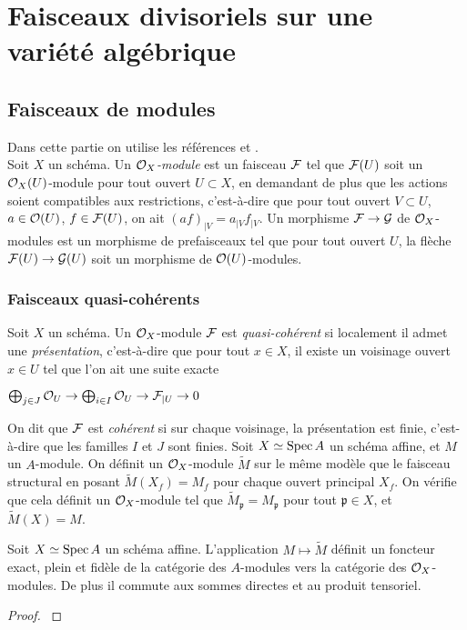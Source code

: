 \chapter{Faisceaux divisoriels sur une variété algébrique}


\section{Faisceaux de modules}

\noindent Dans cette partie on utilise les références \cite{QingLiu} et \cite{Hartshorne}.\\

Soit $X$ un schéma. Un \textit{$\mathcal{O}_X$-module} est un faisceau $\mathcal{F}$ tel que $\mathcal{F}(U)$ soit un $\mathcal{O}_X(U)$-module pour tout ouvert $U\subset X$, en demandant de plus que les actions soient compatibles aux restrictions, c'est-à-dire que pour tout ouvert $V\subset U$, $a\in\mathcal{O}(U)$, $f\in \mathcal{F}(U)$, on ait $(af)_{|V}=a_{|V}f_{|V}$. Un morphisme $\mathcal{F}\rightarrow\mathcal{G}$ de $\mathcal{O}_X$-modules est un morphisme de prefaisceaux tel que pour tout ouvert $U$, la flèche $\mathcal{F}(U)\rightarrow\mathcal{G}(U)$ soit un morphisme de $\mathcal{O}(U)$-modules. 

\subsection{Faisceaux quasi-cohérents}

Soit $X$ un schéma. Un $\mathcal{O}_X$-module $\mathcal{F}$ est \textit{quasi-cohérent} si localement il admet une \textit{présentation}, c'est-à-dire que pour tout $x\in X$, il existe un voisinage ouvert $x\in U$ tel que l'on ait une suite exacte
\begin{center}
$\bigoplus_{j\in J}\mathcal{O}_{U}\rightarrow\bigoplus_{i\in I}\mathcal{O}_{U}\rightarrow \mathcal{F}_{|U}\rightarrow 0$
\end{center}

On dit que $\mathcal{F}$ est \textit{cohérent} si sur chaque voisinage, la présentation est finie, c'est-à-dire que les familles $I$ et $J$ sont finies.
Soit $X\simeq \operatorname{Spec} A$ un schéma affine, et $M$ un $A$-module. On définit un $\mathcal{O}_X$-module $\widetilde{M}$ sur le même modèle que le faisceau structural en posant $\widetilde{M}(X_f)=M_f$ pour chaque ouvert principal $X_f$. On vérifie que cela définit un $\mathcal{O}_X$-module tel que $\widetilde{M}_\mathfrak{p}=M_\mathfrak{p}$ pour tout $\mathfrak{p}\in X$, et $\widetilde{M}(X)=M$.


\begin{prop}
Soit $X\simeq\operatorname{Spec} A$ un schéma affine. L'application $M\mapsto \widetilde{M}$ définit un foncteur exact, plein et fidèle de la catégorie des $A$-modules vers la catégorie des $\mathcal{O}_X$-modules. De plus il commute aux sommes directes et au produit tensoriel.
\end{prop}
\begin{proof}
\cite[II.5.2]{Hartshorne}
\end{proof}


